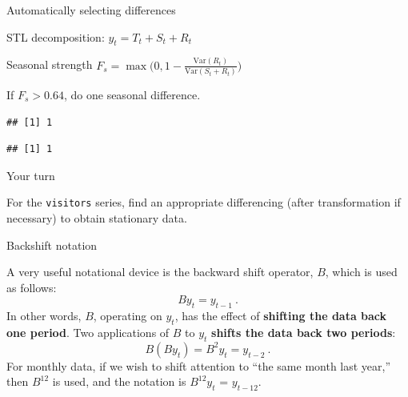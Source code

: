\documentclass[14pt,ignorenonframetext,]{beamer}
\newenvironment{Shaded}{\begin{snugshade}}{\end{snugshade}}
\newcommand{\KeywordTok}[1]{\textcolor[rgb]{0.13,0.29,0.53}{\textbf{#1}}}
\newcommand{\DataTypeTok}[1]{\textcolor[rgb]{0.13,0.29,0.53}{#1}}
\newcommand{\DecValTok}[1]{\textcolor[rgb]{0.00,0.00,0.81}{#1}}
\newcommand{\StringTok}[1]{\textcolor[rgb]{0.31,0.60,0.02}{#1}}
\newcommand{\OperatorTok}[1]{\textcolor[rgb]{0.81,0.36,0.00}{\textbf{#1}}}
\newcommand{\NormalTok}[1]{#1}
\begin{document}
\begin{frame}[fragile]{Automatically selecting differences}

STL decomposition: \(y_t = T_t+S_t+R_t\)

Seasonal strength
\(F_s = \max\big(0, 1-\frac{\text{Var}(R_t)}{\text{Var}(S_t+R_t)}\big)\)

If \(F_s > 0.64\), do one seasonal difference.

\pause\fontsize{12}{15}\sf\vspace*{1cm}

\begin{Shaded}
\end{Shaded}

\begin{verbatim}
## [1] 1
\end{verbatim}

\begin{Shaded}
\end{Shaded}

\begin{verbatim}
## [1] 1
\end{verbatim}

\end{frame}

\begin{frame}[fragile]{Your turn}

For the \texttt{visitors} series, find an appropriate differencing
(after transformation if necessary) to obtain stationary data.

\end{frame}

\begin{frame}{Backshift notation}

A very useful notational device is the backward shift operator, \(B\),
which is used as follows: \[
{B y_{t}  =  y_{t - 1}} \: .
\]\pause
In other words, \(B\), operating on \(y_{t}\), has the effect of
\textbf{shifting  the  data  back  one   period}. \pause
Two applications of \(B\) to \(y_{t}\)
\textbf{shifts the data  back  two
periods}: \[
B(By_{t})  =  B^{2}y_{t}  =  y_{t-2}\: .
\]\pause
For monthly data, if we wish to shift attention to ``the same month last
year,'' then \(B^{12}\) is used, and the notation is \(B^{12}y_{t}\) =
\(y_{t-12}\).

\end{frame}
\end{document}
